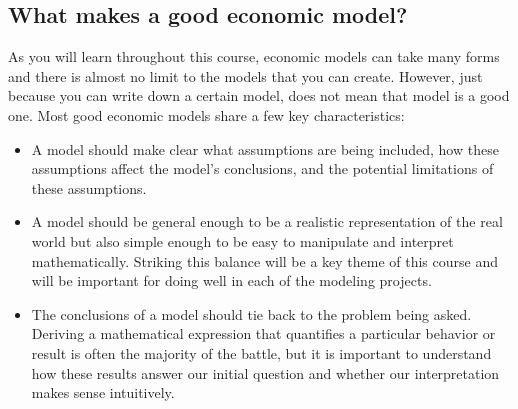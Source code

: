 \subsection*{What makes a good economic model?}
As you will learn throughout this course, economic models can take many forms and there is almost no limit to the models that you can create. However, just because you can write down a certain model, does not mean that model is a good one. Most good economic models share a few key characteristics:
\begin{itemize}
    \item A model should make clear what assumptions are being included, how these assumptions affect the model's conclusions, and the potential limitations of these assumptions.
    \item A model should be general enough to be a realistic representation of the real world but also simple enough to be easy to manipulate and interpret mathematically. Striking this balance will be a key theme of this course and will be important for doing well in each of the modeling projects.
    \item The conclusions of a model should tie back to the problem being asked. Deriving a mathematical expression that quantifies a particular behavior or result is often the majority of the battle, but it is important to understand how these results answer our initial question and whether our interpretation makes sense intuitively.
\end{itemize}

